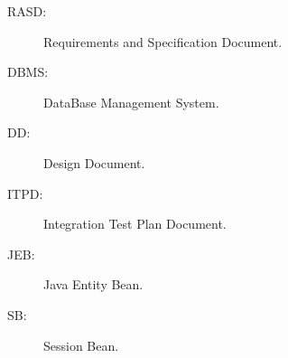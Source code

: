 \begin{description}
\item[RASD:] Requirements and Specification Document.
\item[DBMS:] DataBase Management System.
\item[DD:] Design Document.
\item[ITPD:] Integration Test Plan Document.
\item[JEB:] Java Entity Bean.
\item[SB:] Session Bean.
\end{description}